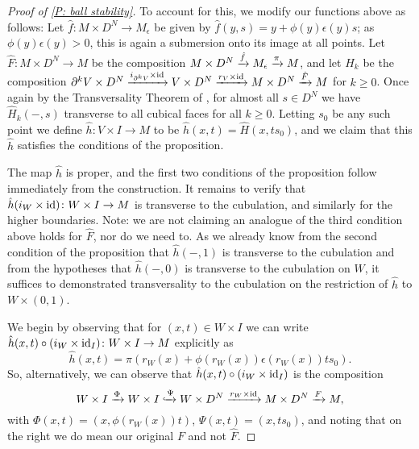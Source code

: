 \begin{proof}[Proof of \cref{P: ball stability}]
	To account for this, we modify our functions above as follows: Let $\hat f \colon M \times D^N \to M_\epsilon$ be given by $\hat f(y, s) = y +\phi(y) \epsilon(y) s$; as $\phi(y)\epsilon(y)>0$, this is again a submersion onto its image at all points.
	Let $\hat F \colon M \times D^N \to M$ be the composition $M \times D^N \xrightarrow{\hat f}M_\epsilon \xrightarrow{\pi}M$, and let $\hat H_k$ be the composition $\partial^kV \times D^N \xrightarrow{i_{\partial^kV} \times \mathrm{id}}V \times D^N \xrightarrow{r_V \times \mathrm{id}} M \times D^N \xrightarrow{\hat F} M$ for $k\geq 0$.
	Once again by the Transversality Theorem of \cite[Section 2.3]{GuPo74}, for almost all $s \in D^N$ we have $\hat H_k(-,s)$ transverse to all cubical faces for all $k\geq 0$.
	Letting $s_0$ be any such point we define $\hat h \colon V \times I \to M$ to be $\hat h(x,t) = \hat H(x,ts_0)$, and we claim that this $\hat h$ satisfies the conditions of the proposition.

	The map $\hat h$ is proper, and the first two conditions of the proposition follow immediately from the construction.
	It remains to verify that $\hat h (i_W \times \mathrm{id}) \colon W \times I \to M$ is transverse to the cubulation, and similarly for the higher boundaries.
	Note: we are not claiming an analogue of the third condition above holds for $\hat F$, nor do we need to.
	As we already know from the second condition of the proposition that $\hat h(-,1)$ is transverse to the cubulation and from the hypotheses that $\hat h(-,0)$ is transverse to the cubulation on $W$, it suffices to demonstrated transversality to the cubulation on the restriction of $\hat h$ to $W \times (0,1)$.

	We begin by observing that for $(x,t) \in W \times I$ we can write $\hat h(x,t) \circ (i_W \times \mathrm{id}_I) \colon W \times I \to M$ explicitly as
	$$\hat h(x,t) = \pi(r_W(x)+\phi(r_W(x))\epsilon(r_W(x))ts_0).$$
	So, alternatively, we can observe that $\hat h(x,t) \circ (i_W \times \mathrm{id}_I)$ is the composition
	\begin{equation}\label{E: alt hat h}
		W \times I \xrightarrow{\Phi} W \times I \xhookrightarrow{\Psi} W \times D^N \xrightarrow{r_W \times \mathrm{id}} M \times D^N \xrightarrow{F} M,
	\end{equation}
	with $\Phi(x,t) = (x,\phi(r_W(x))t)$, $\Psi(x,t) = (x,ts_0)$, and noting that on the right we do mean our original $F$ and not $\hat F$.


\end{proof}
